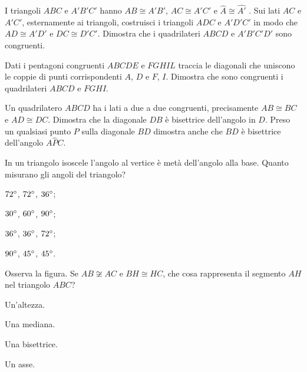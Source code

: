 \begin{multicols}{2}
\begin{esercizio}
\label{ese:2.95}
I triangoli $ABC$ e $A'B'C'$ hanno $AB\cong A'B'$, $AC\cong A'C'$ e $\widehat{A}\cong\widehat{A'}$ . Sui lati $AC$ e $A'C'$, esternamente ai triangoli, costruisci i triangoli $ADC$ e $A'D'C'$ in modo che $AD\cong A'D'$ e $DC\cong D'C'$. Dimostra che i quadrilateri $ABCD$ e $A'B'C'D'$ sono congruenti.
\end{esercizio}

\begin{esercizio}
\label{ese:2.96}
Dati i pentagoni congruenti $ABCDE$ e $FGHIL$ traccia le diagonali che uniscono le coppie di punti corrispondenti $A$, $D$ e $F$, $I$. Dimostra che sono congruenti i quadrilateri $ABCD$ e $FGHI$.
\end{esercizio}

\begin{esercizio}
\label{ese:2.97}
Un quadrilatero $ABCD$ ha i lati a due a due congruenti, precisamente $AB\cong BC$ e $AD\cong DC$. Dimostra che la diagonale $DB$ è bisettrice dell'angolo in $D$. Preso un qualsiasi punto $P$ sulla diagonale $BD$ dimostra anche che $BD$ è bisettrice dell'angolo $A\widehat{P}C$.
\end{esercizio}

\end{multicols}

\begin{esercizio}
\label{ese:2.98}
In un triangolo isoscele l'angolo al vertice è metà dell'angolo alla base. Quanto misurano gli angoli del triangolo?
\begin{multicols}{4}
\begin{enumeratea}
\item $72{}^{\circ}$, $72{}^{\circ}$, $36{}^{\circ}$;
\item $30{}^{\circ}$, $60{}^{\circ}$, $90{}^{\circ}$;
\item $36{}^{\circ}$, $36{}^{\circ}$, $72{}^{\circ}$;
\item $90{}^{\circ}$, $45{}^{\circ}$, $45{}^{\circ}$.
\end{enumeratea}
\end{multicols}
\end{esercizio}

\begin{esercizio}
\label{ese:2.99}
Osserva la figura. Se $AB\not\cong AC$ e $BH\cong HC$, che cosa rappresenta il segmento $AH$ nel triangolo $ABC$?
\begin{multicols}{4}
\begin{enumeratea}
\item Un'altezza.
\item Una mediana.
\item Una bisettrice.
\item Un asse.
\end{enumeratea}
\end{multicols}
\end{esercizio}

